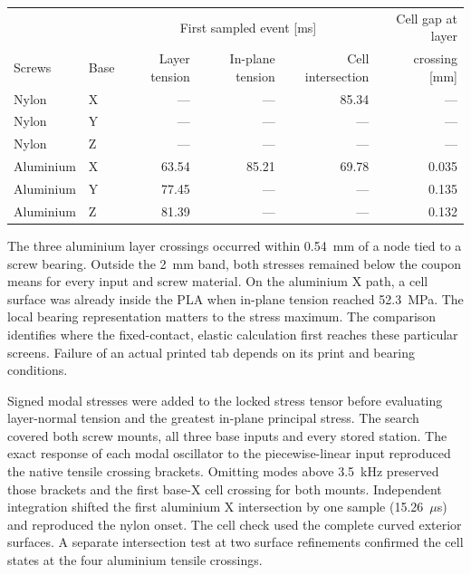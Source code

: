 \begin{center}\small
\begin{tabular}{llrrrr}\toprule
 & & \multicolumn{3}{c}{First sampled event [ms]} & Cell gap at layer\\
Screws & Base & Layer tension & In-plane tension & Cell intersection & crossing [mm]\\\midrule
Nylon & X & --- & --- & 85.34 & ---\\
Nylon & Y & --- & --- & --- & ---\\
Nylon & Z & --- & --- & --- & ---\\
Aluminium & X & 63.54 & 85.21 & 69.78 & 0.035\\
Aluminium & Y & 77.45 & --- & --- & 0.135\\
Aluminium & Z & 81.39 & --- & --- & 0.132\\\bottomrule
\end{tabular}
\end{center}

The three aluminium layer crossings occurred within 0.54~mm of a node tied to a screw bearing. Outside the 2~mm band, both stresses remained below the coupon means for every input and screw material. On the aluminium X path, a cell surface was already inside the PLA when in-plane tension reached 52.3~MPa. The local bearing representation matters to the stress maximum. The comparison identifies where the fixed-contact, elastic calculation first reaches these particular screens. Failure of an actual printed tab depends on its print and bearing conditions.

Signed modal stresses were added to the locked stress tensor before evaluating layer-normal tension and the greatest in-plane principal stress. The search covered both screw mounts, all three base inputs and every stored station. The exact response of each modal oscillator to the piecewise-linear input reproduced the native tensile crossing brackets. Omitting modes above 3.5~kHz preserved those brackets and the first base-X cell crossing for both mounts. Independent integration shifted the first aluminium X intersection by one sample (15.26~$\mu$s) and reproduced the nylon onset. The cell check used the complete curved exterior surfaces. A separate intersection test at two surface refinements confirmed the cell states at the four aluminium tensile crossings.

